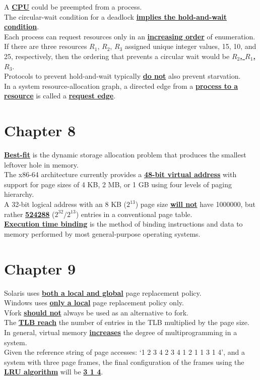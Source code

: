 \documentclass[10pt]{article}
\newcommand{\qw}[1]{\textbf{\ul{#1}}}
\begin{document}
A \qw{CPU} could be preempted from a process.\\[2mm]
The circular-wait condition for a deadlock \qw{implies the hold-and-wait condition}.\\[2mm]
Each process can request resources only in an \qw{increasing order} of enumeration. If there are three resources $R_1$, $R_2$, $R_3$ assigned unique integer values, 15, 10, and 25, respectively, then the ordering that prevents a circular wait would be \qw{$R_2$, $R_1$, $R_3$}.\\[2mm]
Protocols to prevent hold-and-wait typically \qw{do not} also prevent starvation.\\[2mm]
In a system resource-allocation graph, a directed edge from a \qw{process to a resource} is called a \qw{request edge}.\\[2mm]
\newpage



\section*{\centering Chapter 8}
\qw{Best-fit} is the dynamic storage allocation problem that produces the smallest leftover hole in memory.\\[2mm]
The x86-64 architecture currently provides a \qw{48-bit virtual address} with support for page sizes of 4 KB, 2 MB, or 1 GB using four levels of paging hierarchy.\\[2mm]
A 32-bit logical address with an 8 KB ($2^{13}$) page size \qw{will not} have 1000000, but rather \qw{524288} ($2^{32}/2^{13}$) entries in a conventional page table.\\[2mm]
\qw{Execution time binding} is the method of binding instructions and data to memory performed by most general-purpose operating systems.\\[2mm]
\newpage



\section*{\centering Chapter 9}
Solaris uses \qw{both a local and global} page replacement policy.\\[2mm]
Windows uses \qw{only a local} page replacement policy only.\\[2mm]
Vfork \qw{should not} always be used as an alternative to fork.\\[2mm]
The \qw{TLB reach} the number of entries in the TLB multiplied by the page size.\\[2mm]
In general, virtual memory \qw{increases} the degree of multiprogramming in a system.\\[2mm]
Given the reference string of page accesses: `1 2 3 4 2 3 4 1 2 1 1 3 1 4', and a system with three page frames, the final configuration of the frames using the \qw{LRU algorithm} will be \qw{3 1 4}.\\[2mm]
\newpage
\end{document}
